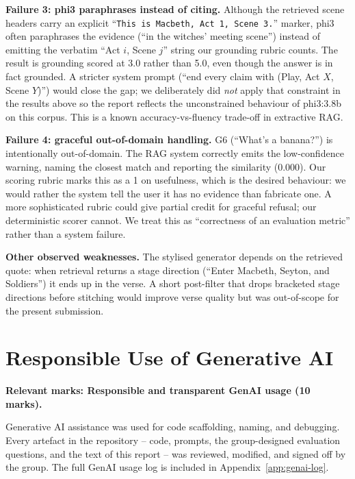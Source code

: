 \documentclass[10pt,twocolumn,a4paper]{article}
\begin{document}
\textbf{Failure 3: phi3 paraphrases instead of citing.}
Although the retrieved scene headers carry an explicit
``\texttt{This is Macbeth, Act 1, Scene 3.}'' marker, phi3 often
paraphrases the evidence (``in the witches' meeting scene'') instead
of emitting the verbatim ``Act $i$, Scene $j$'' string our grounding
rubric counts. The result is grounding scored at 3.0 rather than 5.0,
even though the answer is in fact grounded. A stricter system prompt
(``end every claim with (Play, Act $X$, Scene $Y$)'') would close
the gap; we deliberately did \emph{not} apply that constraint in the
results above so the report reflects the unconstrained behaviour of
phi3:3.8b on this corpus. This is a known accuracy-vs-fluency
trade-off in extractive RAG.

\textbf{Failure 4: graceful out-of-domain handling.}
G6 (``What's a banana?'') is intentionally out-of-domain. The RAG
system correctly emits the low-confidence warning, naming the closest
match and reporting the similarity (0.000). Our scoring rubric marks
this as a 1 on usefulness, which is the desired behaviour: we would
rather the system tell the user it has no evidence than fabricate one.
A more sophisticated rubric could give partial credit for graceful
refusal; our deterministic scorer cannot. We treat this as
``correctness of an evaluation metric'' rather than a system failure.

\textbf{Other observed weaknesses.}
The stylised generator depends on the retrieved quote: when retrieval
returns a stage direction (``Enter Macbeth, Seyton, and Soldiers'') it
ends up in the verse. A short post-filter that drops bracketed stage
directions before stitching would improve verse quality but was
out-of-scope for the present submission.

\section{Responsible Use of Generative AI}
\label{sec:genai}

\textbf{Relevant marks: Responsible and transparent GenAI usage (10 marks).}

Generative AI assistance was used for code scaffolding, naming, and
debugging. Every artefact in the repository -- code, prompts, the
group-designed evaluation questions, and the text of this report --
was reviewed, modified, and signed off by the group. The full GenAI
usage log is included in Appendix~\ref{app:genai-log}.
\end{document}
